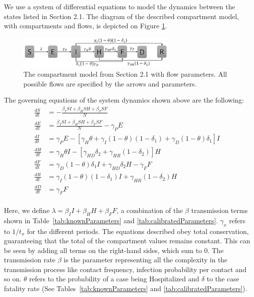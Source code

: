 We use a system of differential equations to model the dynamics between the states listed in Section 2.1. The diagram of the described compartment model, with compartments and flows, is depicted on Figure \ref{fig:compartment}.\\


\begin{figure}[!h]
  \centering
  \includegraphics[width=0.7\textwidth]{compartment}
  \caption{The compartment model from Section 2.1 with flow parameters. All possible flows are specified by the arrows and parameters. } 
\label{fig:compartment} 
\end{figure}


The governing equations of the system dynamics shown above are the following:
\begin{align}
\frac{dS}{dt} &= - \frac{\beta_{I}SI+\beta_{H}SH+\beta_{F}SF}{N} \label{eqn:SD1}\\
\frac{dE}{dt} &=  \frac{\beta_{I}SI+\beta_{H}SH+\beta_{F}SF}{N}-\gamma_P E         \label{eqn:SD2}\\
\frac{dI}{dt} &=  \gamma_P E - [\gamma_{H}\theta + \gamma_{I}(1-\theta)(1-\delta_{1})+\gamma_{D}(1-\theta)\delta_{1}]I \label{eqn:SD3}\\
\frac{dH}{dt} &= \gamma_{H}\theta I - [\gamma_{HD}\delta_{2}+\gamma_{HR}(1-\delta_{2})]H \label{eqn:SD4}\\
\frac{dF}{dt} &= \gamma_{D}(1-\theta) \delta_{1} I + \gamma_{HD}\delta_{2} H-\gamma_{F} F  \label{eqn:SD5}\\
\frac{dR}{dt} &= \gamma_{I}(1-\theta)(1- \delta_{1}) I + \gamma_{HR}(1-\delta_{2}) H       \label{eqn:SD6}\\
\frac{dD}{dt} &= \gamma_{F} F  \label{eqn:SD7}
\end{align}\\

 Here, we define $\lambda = \beta_{I}I+\beta_{H}H+\beta_{F}F $, a combination of the $\beta$ transmission terms shown in Table~\ref{tab:knownParameters} and \ref{tab:calibratedParameters}. $\gamma_x$ refers to $1/t_x$ for the different periods. The equations described obey total conservation, guaranteeing that the total of the compartment values remains constant. This can be seen by adding all terms on the right-hand sides, which sum to 0. The transmission rate $\beta$ is the parameter representing all the complexity in the transmission process like contact frequency, infection probability per contact and so on. $\theta$ refers to the probability of a case being Hospitalized and $\delta$ to the case fatality rate (See Tables~\ref{tab:knownParameters} and \ref{tab:calibratedParameters}).


